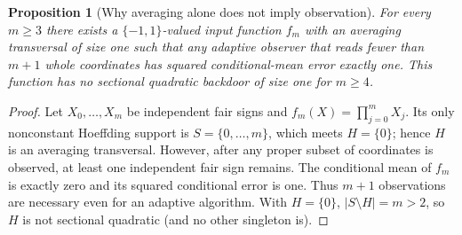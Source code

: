\documentclass[11pt,letterpaper]{article}
\newtheorem{proposition}[theorem]{Proposition}
\theoremstyle{definition}
\begin{document}
\begin{proposition}[Why averaging alone does not imply observation]\label{prop:weak-not-observe}
For every $m\ge3$ there exists a $\{-1,1\}$-valued input function
$f_m$ with an averaging transversal of size one such that any
adaptive observer that reads fewer than $m+1$ whole coordinates has
squared conditional-mean error exactly one. This function has
\emph{no} sectional quadratic backdoor of size one for $m\ge4$.
\end{proposition}
\begin{proof}
Let $X_0,\ldots,X_m$ be independent fair signs and
$f_m(X)=\prod_{j=0}^m X_j$. Its only nonconstant Hoeffding support is
$S=\{0,\ldots,m\}$, which meets $H=\{0\}$; hence $H$ is an averaging
transversal. However, after any proper subset of coordinates is
observed, at least one independent fair sign remains. The
conditional mean of $f_m$ is exactly zero and its squared conditional
error is one. Thus $m+1$ observations are necessary even for an
adaptive algorithm. With $H=\{0\}$, $|S\setminus H|=m>2$,
so $H$ is not sectional quadratic (and no other singleton is).
\end{proof}
\end{document}
